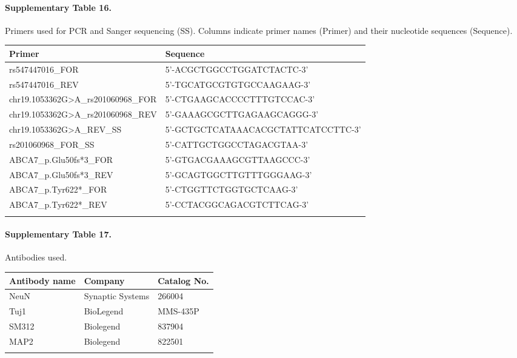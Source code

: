 \paragraph*{Supplementary Table 16.} Primers used for PCR and Sanger sequencing (SS). Columns indicate primer names (Primer) and their nucleotide sequences (Sequence).
{}
\begin{longtable}{p{7.5cm} p{10.5cm}}
    \hline
    \textbf{Primer} & \textbf{Sequence} \\
    \hline
    \hline
    rs547447016\_FOR              & 5’-ACGCTGGCCTGGATCTACTC-3’ \\
    \hline
    rs547447016\_REV              & 5’-TGCATGCGTGTGCCAAGAAG-3’ \\
    \hline
    chr19.1053362G>A\_rs201060968\_FOR   & 5’-CTGAAGCACCCCTTTGTCCAC-3’ \\
    \hline
    chr19.1053362G>A\_rs201060968\_REV   & 5’-GAAAGCGCTTGAGAAGCAGGG-3’ \\
    \hline
    chr19.1053362G>A\_REV\_SS      & 5’-GCTGCTCATAAACACGCTATTCATCCTTC-3’ \\
    \hline
    rs201060968\_FOR\_SS          & 5’-CATTGCTGGCCTAGACGTAA-3’ \\
    \hline
    ABCA7\_p.Glu50fs*3\_FOR       & 5’-GTGACGAAAGCGTTAAGCCC-3’ \\
    \hline
    ABCA7\_p.Glu50fs*3\_REV       & 5’-GCAGTGGCTTGTTTGGGAAG-3’ \\
    \hline
    ABCA7\_p.Tyr622*\_FOR         & 5’-CTGGTTCTGGTGCTCAAG-3’ \\
    \hline
    ABCA7\_p.Tyr622*\_REV         & 5’-CCTACGGCAGACGTCTTCAG-3’ \\
    \label{tab:pcr_primers}
\end{longtable}

\paragraph*{Supplementary Table 17.} Antibodies used. 
{}
\begin{longtable}{p{6cm} p{5cm} p{6cm}}
    \hline
    \textbf{Antibody name}                & \textbf{Company}      & \textbf{Catalog No.} \\
    \hline
    \hline
    NeuN                                  & Synaptic Systems      & 266004               \\
    \hline
    Tuj1                                  & BioLegend             & MMS-435P             \\
    \hline
    SM312        & Biolegend             & 837904               \\
    \hline
    MAP2                                  & Biolegend             & 822501               \\
    \hline
    \label{tab:antibodies_used}
\end{longtable}

    
    